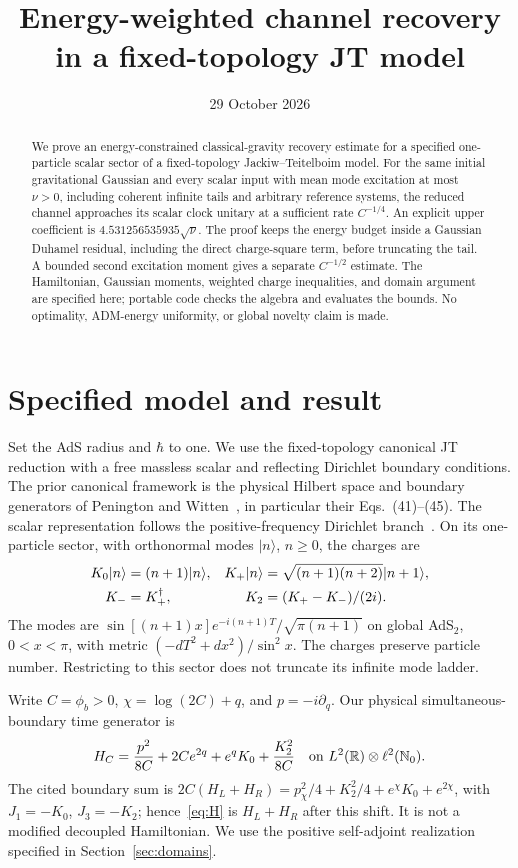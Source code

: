 \documentclass[11pt]{article}
\author{}
\date{29 October 2026}
\title{Energy-weighted channel recovery\\in a fixed-topology JT model}
\begin{document}
\maketitle
\begin{abstract}
We prove an energy-constrained classical-gravity recovery estimate for a
specified one-particle scalar sector of a fixed-topology Jackiw--Teitelboim
model. For the same initial gravitational Gaussian and every scalar input
with mean mode excitation at most $\nu>0$, including coherent infinite tails
and arbitrary reference systems, the reduced channel approaches its scalar
clock unitary at a sufficient rate $C^{-1/4}$. An explicit upper coefficient
is $4.531256535935\sqrt\nu$. The proof keeps the energy budget inside a
Gaussian Duhamel residual, including the direct charge-square term, before
truncating the tail. A bounded second excitation moment gives a separate
$C^{-1/2}$ estimate. The Hamiltonian, Gaussian moments, weighted charge
inequalities, and domain argument are specified here; portable code checks
the algebra and evaluates the bounds. No optimality, ADM-energy uniformity,
or global novelty claim is made.
\end{abstract}

\section{Specified model and result}
Set the AdS radius and $\hbar$ to one. We use the fixed-topology canonical
JT reduction with a free massless scalar and reflecting Dirichlet boundary
conditions. The prior canonical framework is the physical Hilbert space
and boundary generators of Penington and Witten~\citep{PeningtonWitten},
in particular their Eqs.~(41)--(45). The scalar representation follows the
positive-frequency Dirichlet branch~\citep{Higuchi2022}. On its one-particle
sector, with orthonormal modes $|n\rangle$, $n\ge0$, the charges are
\begin{align}
 K_0|n\rangle&=(n+1)|n\rangle,&
 K_+|n\rangle&=\sqrt{(n+1)(n+2)}|n+1\rangle,\notag\\
 K_-&=K_+^\dagger,& K_2&=(K_+-K_-)/(2i). \label{eq:charges}
\end{align}
The modes are $\sin[(n+1)x]e^{-i(n+1)T}/\sqrt{\pi(n+1)}$ on global
AdS$_2$, $0<x<\pi$, with metric $(-dT^2+dx^2)/\sin^2x$. The charges
preserve particle number. Restricting to this sector does not truncate
its infinite mode ladder.

Write $C=\phi_b>0$, $\chi=\log(2C)+q$, and $p=-i\partial_q$.
Our physical simultaneous-boundary time generator is
\begin{equation}
 H_C={p^2\over8C}+2Ce^{2q}+e^qK_0+{K_2^2\over8C}
 \quad\text{on }L^2(\mathbb R)\otimes\ell^2(\mathbb N_0).
 \label{eq:H}
\end{equation}
The cited boundary sum is
$2C(H_L+H_R)=p_\chi^2/4+K_2^2/4+e^\chi K_0+e^{2\chi}$,
with $J_1=-K_0$, $J_3=-K_2$; hence~\eqref{eq:H} is $H_L+H_R$
after this shift. It is not a modified decoupled Hamiltonian.
We use the positive self-adjoint realization specified in Section~\ref{sec:domains}.
\end{document}
